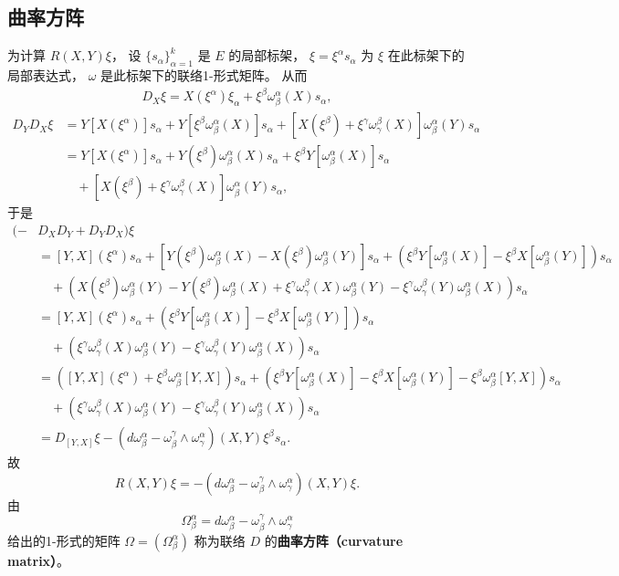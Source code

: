 \subsection{曲率方阵}
为计算 $R(X,Y)\xi$， 设 $\{s_\alpha\}_{\alpha=1}^k$ 是 $E$ 的局部标架， $\xi=\xi^\alpha s_\alpha$ 为 $\xi$ 在此标架下的局部表达式， $\omega$ 是此标架下的联络1-形式矩阵。 从而
$$
\begin{aligned}
D_X\xi=X(\xi^\alpha)\xi_\alpha+\xi^\beta\omega_\beta^\alpha(X) s_\alpha,
\end{aligned}
$$
$$
\begin{aligned}
D_YD_X\xi&=Y[X(\xi^\alpha)]s_\alpha+Y[\xi^\beta\omega_\beta^\alpha(X)] s_\alpha
+[X(\xi^\beta)+\xi^\gamma\omega_\gamma^\beta(X)]\omega_\beta^\alpha(Y) s_\alpha \\
&=Y[X(\xi^\alpha)]s_\alpha+Y(\xi^\beta)\omega_\beta^\alpha(X)s_\alpha+\xi^\beta Y[\omega_\beta^\alpha(X)]s_\alpha\\
&\quad+[X(\xi^\beta)+\xi^\gamma\omega_\gamma^\beta(X)]\omega_\beta^\alpha(Y) s_\alpha ,
\end{aligned}
$$
于是
$$
\begin{aligned}
(-&D_XD_Y+D_YD_X)\xi\\
&=[Y,X](\xi^\alpha)s_\alpha
+[Y(\xi^\beta)\omega_\beta^\alpha(X)-X(\xi^\beta)\omega_\beta^\alpha(Y)]s_\alpha+\left(\xi^\beta Y[\omega_\beta^\alpha(X)]-\xi^\beta X[\omega_\beta^\alpha(Y)]\right)s_\alpha\\
&\quad+\left(X(\xi^\beta)\omega_\beta^\alpha(Y)-Y(\xi^\beta)\omega_\beta^\alpha(X)+\xi^\gamma\omega_\gamma^\beta(X)\omega_\beta^\alpha(Y)-\xi^\gamma\omega_\gamma^\beta(Y)\omega_\beta^\alpha(X) \right)s_\alpha\\
&=[Y,X](\xi^\alpha)s_\alpha+\left(\xi^\beta Y[\omega_\beta^\alpha(X)]-\xi^\beta X[\omega_\beta^\alpha(Y)]\right)s_\alpha\\
&\quad+\left(\xi^\gamma\omega_\gamma^\beta(X)\omega_\beta^\alpha(Y)-\xi^\gamma\omega_\gamma^\beta(Y)\omega_\beta^\alpha(X) \right)s_\alpha\\
&=\left([Y,X](\xi^\alpha)+\xi^\beta\omega_\beta^\alpha[Y,X]\right)s_\alpha
+\left(\xi^\beta Y[\omega_\beta^\alpha(X)]-\xi^\beta X[\omega_\beta^\alpha(Y)]-\xi^\beta\omega_\beta^\alpha[Y,X]\right)s_\alpha\\
&\quad+\left(\xi^\gamma\omega_\gamma^\beta(X)\omega_\beta^\alpha(Y)-\xi^\gamma\omega_\gamma^\beta(Y)\omega_\beta^\alpha(X) \right)s_\alpha\\
&=D_{[Y,X]}\xi-(d\omega_\beta^\alpha-\omega_\beta^\gamma\wedge\omega_\gamma^\alpha)(X,Y)\xi^\beta s_\alpha.
\end{aligned}
$$
故
$$
R(X,Y)\xi=-(d\omega_\beta^\alpha-\omega_\beta^\gamma\wedge\omega_\gamma^\alpha)(X,Y)\xi.
$$
由
$$
\Omega_\beta^\alpha=d\omega_\beta^\alpha-\omega_\beta^\gamma\wedge\omega_\gamma^\alpha
$$
给出的1-形式的矩阵 $\Omega=(\Omega_\beta^\alpha)$ 称为联络 $D$ 的\textbf{曲率方阵（curvature matrix）}。 

